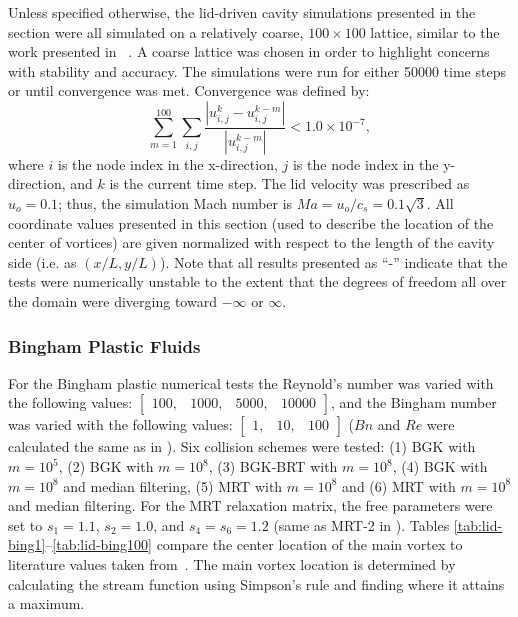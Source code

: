 Unless specified otherwise, the lid-driven cavity simulations presented in the section were all simulated on a relatively coarse, $100 \times 100$ lattice, similar to the work presented in ~\cite{brownlee2008nonequilibrium}.
A coarse lattice was chosen in order to highlight concerns with stability and accuracy.
The simulations were run for either 50000 time steps or until convergence was met.
Convergence was defined by:
\begin{equation} \label{eq:convergence}
\sum_{m=1}^{100} \sum_{i, j} \frac{|u_{i, j}^k - u_{i, j}^{k-m}|}{|u_{i, j}^{k-m}|} < 1.0 \times 10^{-7},
\end{equation}
\noindent where $i$ is the node index in the x-direction, $j$ is the node index in the y-direction, and $k$ is the current time step.
The lid velocity was prescribed as $u_o = 0.1$; thus, the simulation Mach number is $Ma = u_o / c_s = 0.1 \sqrt{3}$.
All coordinate values presented in this section (used to describe the location of the center of vortices) are given normalized with respect to the length of the cavity side (i.e. as $(x / L, y / L)$).
Note that all results presented as ``-'' indicate that the tests were numerically unstable to the extent that the degrees of freedom all over the domain were diverging toward $-\infty$ or $\infty$.

\subsubsection{Bingham Plastic Fluids}

For the Bingham plastic numerical tests the Reynold's number was varied with the following values: $\begin{bmatrix}100,&1000,&5000,&10000\end{bmatrix}$, and the Bingham number was varied with the following values: $\begin{bmatrix}1,&10,&100\end{bmatrix}$ ($Bn$ and $Re$ were calculated the same as in ).
Six collision schemes were tested: (1) BGK with $m = 10^5$, (2) BGK with $m = 10^8$, (3) BGK-BRT with $m = 10^8$, (4) BGK with $m = 10^8$ and median filtering, (5) MRT with $m = 10^8$ and (6) MRT with $m = 10^8$ and median filtering.
For the MRT relaxation matrix, the free parameters were set to $s_1 = 1.1$, $s_2 = 1.0$, and $s_4 = s_6 = 1.2$ (same as MRT-2 in ).
Tables \ref{tab:lid-bing1}--\ref{tab:lid-bing100} compare the center location of the main vortex to literature values taken from~\citet{syrakos2014performance}.
The main vortex location is determined by calculating the stream function using Simpson's rule and finding where it attains a maximum.

